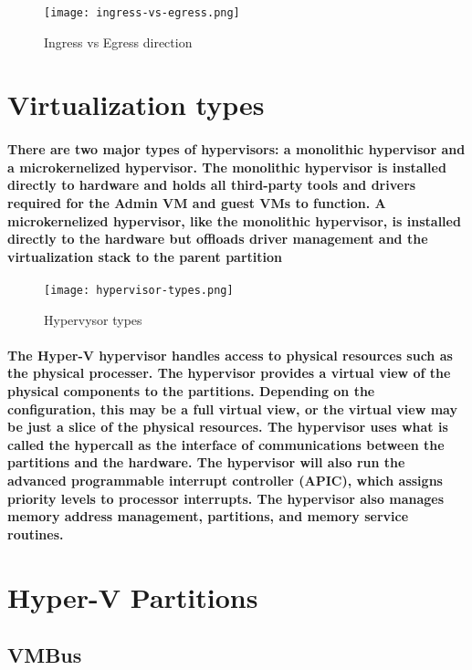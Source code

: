 \begin{figure}[h]
\centering
\texttt{[image: ingress-vs-egress.png]}
\caption{Ingress vs Egress direction}
\label{ingress-vs-egress}
\end{figure}

\section{Virtualization types}
\paragraph{There are two major types of hypervisors: a monolithic hypervisor and a microkernelized hypervisor. The monolithic hypervisor is installed directly to hardware and holds
all third-party tools and drivers required for the Admin VM and guest VMs to function. A microkernelized hypervisor, like the monolithic hypervisor, is installed directly to the
hardware but offloads driver management and the virtualization stack to the parent partition}

\begin{figure}[h]
\centering
\texttt{[image: hypervisor-types.png]}
\caption{Hypervysor types}
\label{hypervisor-types}
\end{figure}

\paragraph{The Hyper-V hypervisor handles access to physical resources such as the physical processer. The hypervisor provides a virtual view of the physical components to the
partitions. Depending on the configuration, this may be a full virtual view, or the virtual view may be just a slice of the physical resources. The hypervisor uses what is called the
hypercall as the interface of communications between the partitions and the hardware. The hypervisor will also run the advanced programmable interrupt controller (APIC),
which assigns priority levels to processor interrupts. The hypervisor also manages memory address management, partitions, and memory service routines.}

\section{Hyper-V Partitions}
\subsection{VMBus}

